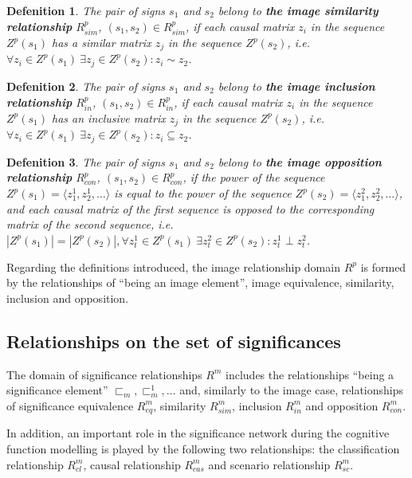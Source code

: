 \documentclass[review]{elsarticle}
\newtheorem{definition}{Defenition}
\begin{document}
\begin{definition}\label{def:sim}
	The pair of signs $s_1$ and $s_2$ belong to \textbf{the image similarity relationship} $R_{sim}^p$, $(s_1,s_2)\in R_{sim}^p$, if each causal matrix $z_i$ in the sequence $Z^p(s_1)$ has a similar matrix $z_j$ in the sequence $Z^p(s_2)$, i.e. $\forall z_i\in Z^p(s_1)\ \exists z_j\in Z^p(s_2): z_i\sim z_2$.
\end{definition}

\begin{definition}
	The pair of signs $s_1$ and $s_2$ belong to \textbf{the image inclusion relationship} $R_{in}^p$, $(s_1,s_2)\in R_{in}^p$, if each causal matrix $z_i$ in the sequence $Z^p(s_1)$ has an inclusive matrix $z_j$ in the sequence $Z^p(s_2)$, i.e. $\forall z_i\in Z^p(s_1)\ \exists z_j\in Z^p(s_2): z_i\subseteq z_2$.
\end{definition}

\begin{definition}
	The pair of signs $s_1$ and $s_2$ belong to \textbf{the image opposition relationship} $R_{con}^p$, $(s_1,s_2)\in R_{con}^p$, if the power of the sequence $Z^p(s_1)=\langle z_1^1,z_2^1,\dots\rangle$ is equal to the power of the sequence $Z^p(s_2)=\langle z_1^2,z_2^2,\dots\rangle$, and each causal matrix of the first sequence is opposed to the corresponding matrix of the second sequence, i.e. $|Z^p(s_1)| = |Z^p(s_2)|, \forall z_t^1\in Z^p(s_1)\ \exists z_t^2\in Z^p(s_2): z_t^1\perp z_t^2$.
\end{definition}

Regarding the definitions introduced, the image relationship domain $R^p$ is formed by the relationships of ``being an image element'', image equivalence, similarity, inclusion and opposition.

\subsection{Relationships on the set of significances}	

The domain of significance relationships $R^m$ includes the relationships ``being a significance element'' ${\sqsubset_m,\sqsubset_m^1,\dots}$ and, similarly to the image case, relationships of significance equivalence $R_{eq}^m$, similarity $R_{sim}^m$, inclusion $R_{in}^m$ and opposition $R_{con}^m$.

In addition, an important role in the significance network during the cognitive function modelling is played by the following two relationships: the classification relationship $R_{cl}^m$, causal relationship $R_{cas}^m$ and scenario relationship $R_{sc}^m$.
\end{document}
